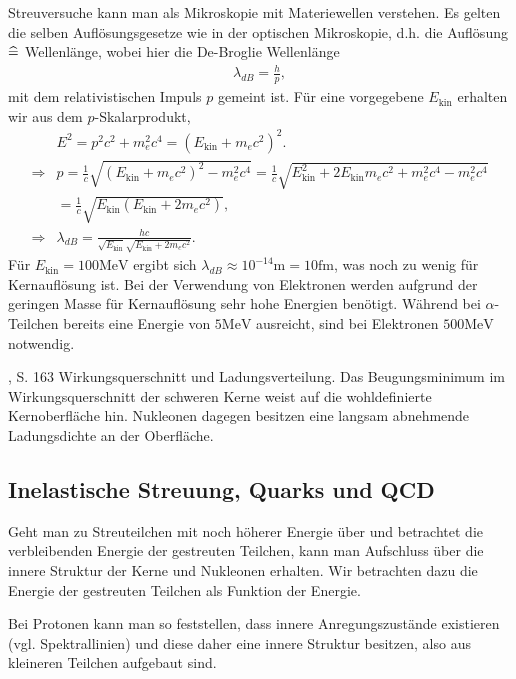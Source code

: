 \begin{bemn}
Streuversuche kann man als Mikroskopie mit Materiewellen verstehen. Es gelten
die selben Auflösungsgesetze wie in der optischen Mikroskopie, d.h. die
Auflösung $\mathrel{\widehat{=}}$ Wellenlänge, wobei hier die De-Broglie Wellenlänge
\begin{align*}
\lambda_{dB} = \frac{h}{p},
\end{align*}
mit dem relativistischen Impuls $p$ gemeint ist. Für eine vorgegebene
$E_\text{kin}$ erhalten wir aus dem $p$-Skalarprodukt,
\begin{align*}
&E^2 = p^2c^2 +m_e^2c^4 = (E_\text{kin}+m_ec^2)^2.\\
\Rightarrow & p = \frac{1}{c}\sqrt{(E_\text{kin}+m_ec^2)^2 - m_e^2c^4}
= \frac{1}{c}\sqrt{E_\text{kin}^2+2E_\text{kin}m_ec^2+m_e^2c^4 - m_e^2c^4}
\\ &= \frac{1}{c}\sqrt{E_\text{kin}(E_\text{kin}+2m_ec^2)},\\
\Rightarrow & \lambda_{dB} =
\frac{hc}{\sqrt{E_\text{kin}}\sqrt{E_\text{kin}+2m_ec^2}}.
\end{align*}
Für $E_\text{kin}=100 \mathrm{MeV}$ ergibt sich $\lambda_{dB}\approx
10^{-14}\mathrm{m} = 10 \mathrm{fm}$, was noch zu wenig für Kernauflösung ist.
Bei der Verwendung von Elektronen werden aufgrund der geringen Masse für
Kernauflösung sehr hohe Energien benötigt. Während bei $\alpha$-Teilchen
bereits eine Energie von $5 \mathrm{MeV}$ ausreicht, sind bei Elektronen $500
\mathrm{MeV}$ notwendig.\maphere
\end{bemn}

%
	{\FrauenfelderHenley, S. 163}
	{Wirkungsquerschnitt und Ladungsverteilung. Das Beugungsminimum im
	Wirkungsquerschnitt der schweren Kerne weist auf die wohldefinierte
	Kernoberfläche hin. Nukleonen dagegen besitzen eine langsam abnehmende
	Ladungsdichte an der Oberfläche.}

\subsection{Inelastische Streuung, Quarks und QCD}
Geht man zu Streuteilchen mit noch höherer Energie über und betrachtet die
verbleibenden Energie der gestreuten Teilchen, kann man Aufschluss über die
innere Struktur der Kerne und Nukleonen erhalten. Wir betrachten dazu die
Energie der gestreuten Teilchen als Funktion der Energie.
 
Bei Protonen kann man so feststellen, dass innere Anregungszustände existieren
(vgl. Spektrallinien) und diese daher eine innere Struktur besitzen, also aus
kleineren Teilchen aufgebaut sind.

